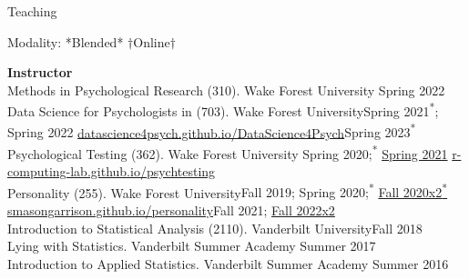 \begin{rSection}{\textrm{Teaching}}
\vspace*{2pt}
\vspace{-1mm}\begin{center}\footnotesize{Modality: *Blended* $\dagger$Online$\dagger$}\end{center}\vspace{-4mm}
{\large  \bf Instructor}\\
Methods in Psychological Research (310). Wake Forest University \hfill{Spring 2022}\\
Data Science for Psychologists in \R (703). Wake Forest University\hfill{Spring 2021\textsuperscript{*}; Spring 2022}
\hspace*{6 mm} \href{https://datascience4psych.github.io/DataScience4Psych/}{\color{blue} datascience4psych.github.io/DataScience4Psych}\hfill{Spring 2023\textsuperscript{*}}\smallskip\\
Psychological Testing  (362). Wake Forest University \hfill{Spring 2020;\textsuperscript{*} \href{https://www.youtube.com/playlist?list=PLKrrdtYgOUYYgag4erySD7L0jDcZGMlS_}{\color{blue}Spring 2021\noteBns}}
\hspace* {6 mm} \href{https://r-computing-lab.github.io/psychtesting/}{\color{blue} r-computing-lab.github.io/psychtesting}\smallskip\\
Personality (255). Wake Forest University\hfill{Fall 2019; Spring 2020;\textsuperscript{*} \href{https://www.youtube.com/playlist?list=PLKrrdtYgOUYZpENpYddjG8n_q3bfbx8Kr}{\color{blue}Fall 2020x2\textsuperscript{*}\noteBns}}
\hspace* {6 mm} \href{https://smasongarrison.github.io/personality/}{\color{blue} smasongarrison.github.io/personality}\hfill{Fall 2021; \href{https://www.youtube.com/playlist?list=PLKrrdtYgOUYZpENpYddjG8n_q3bfbx8Kr}{Fall 2022x2\noteBns}}\smallskip\\
Introduction to Statistical Analysis (2110). Vanderbilt University\hfill {Fall 2018}\\
Lying with Statistics. Vanderbilt Summer Academy \hfill{Summer 2017}\\
Introduction to Applied Statistics. Vanderbilt Summer Academy \hfill{Summer 2016}\smallskip\\

\end{rSection}
